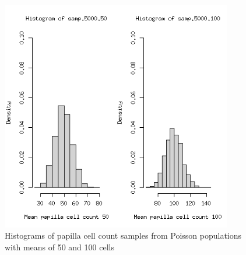%

\begin{figure}[h]
  \centering
   \includegraphics[width=0.9\textwidth]{dpcchist2.png}
  \caption{Histograms of papilla cell count samples from Poisson populations with means of 50 and 100 cells}
  \label{fig:dpcchist}
\end{figure}

%

